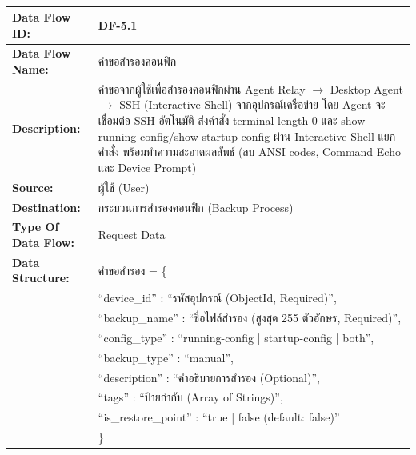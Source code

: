 
\begin{table}[H]
    \caption{}
    \label{tab:df-5-1}
    \fontSixTeen 
    \begin{tabularx}{\textwidth}{|l|L|} 
        \hline
        \textbf{Data Flow ID:} & DF-5.1 \\
        \hline
        \textbf{Data Flow Name:} & คำขอสำรองคอนฟิก \\
        \hline
        \textbf{Description:} & คำขอจากผู้ใช้เพื่อสำรองคอนฟิกผ่าน Agent Relay $\rightarrow$ Desktop Agent $\rightarrow$ SSH (Interactive Shell) จากอุปกรณ์เครือข่าย โดย Agent จะเชื่อมต่อ SSH อัตโนมัติ ส่งคำสั่ง terminal length 0 และ show running-config/show startup-config ผ่าน Interactive Shell แยกคำสั่ง พร้อมทำความสะอาดผลลัพธ์ (ลบ ANSI codes, Command Echo และ Device Prompt) \\
        \hline
        \textbf{Source:} & ผู้ใช้ (User) \\
        \hline
        \textbf{Destination:} & กระบวนการสำรองคอนฟิก (Backup Process) \\
        \hline
        \textbf{Type Of Data Flow:} & Request Data \\
        \hline
        \textbf{Data Structure:} & คำขอสำรอง = \{ \nonumber \\
                        & \hspace{1em} ``device\_id'' : ``รหัสอุปกรณ์ (ObjectId, Required)'', \nonumber \\
                        & \hspace{1em} ``backup\_name'' : ``ชื่อไฟล์สำรอง (สูงสุด 255 ตัวอักษร, Required)'', \nonumber \\
                        & \hspace{1em} ``config\_type'' : ``running-config | startup-config | both'', \nonumber \\
                        & \hspace{1em} ``backup\_type'' : ``manual'', \nonumber \\
                        & \hspace{1em} ``description'' : ``คำอธิบายการสำรอง (Optional)'', \nonumber \\
                        & \hspace{1em} ``tags'' : ``ป้ายกำกับ (Array of Strings)'', \nonumber \\
                        & \hspace{1em} ``is\_restore\_point'' : ``true | false (default: false)'' \nonumber \\
                        & \} \\
        \hline
    \end{tabularx}
\end{table}

